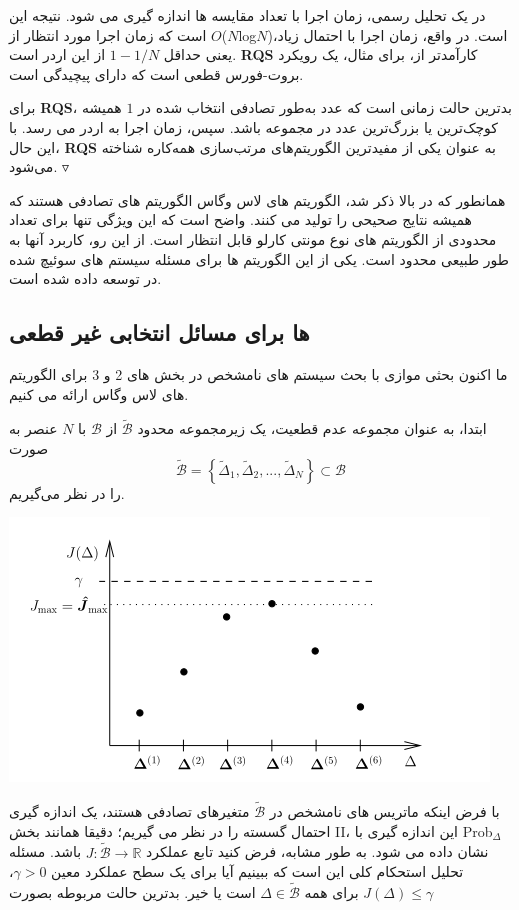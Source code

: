 \documentclass[12pt]{article} %
\begin{document}
	\par
	در یک تحلیل رسمی، زمان اجرا با تعداد مقایسه ها اندازه گیری می شود. نتیجه این است که زمان اجرا مورد انتظار از {$O$($N$log$N$)}\lr است. در واقع، زمان اجرا با احتمال زیاد، یعنی حداقل $1 − 1/N$ از این اردر است.  
	\cite{bib15}
	\textbf{RQS}
	 کارآمدتر از، برای مثال، یک رویکرد بروت-فورس قطعی است که دارای پیچیدگی
	 	است.
	\par
	برای \textbf{RQS}، بدترین حالت زمانی است که عدد به‌طور تصادفی انتخاب شده در $1$ همیشه کوچک‌ترین یا بزرگ‌ترین عدد در مجموعه باشد. سپس، زمان اجرا به اردر   می رسد. با این حال، \textbf{RQS} به عنوان یکی از مفیدترین الگوریتم‌های مرتب‌سازی همه‌کاره شناخته می‌شود.
	\cite{bib14}
	$\triangledown$
	\par
	همانطور که در بالا ذکر شد، الگوریتم های لاس وگاس الگوریتم های تصادفی هستند که همیشه نتایج صحیحی را تولید می کنند. واضح است که این ویژگی تنها برای تعداد محدودی از الگوریتم های نوع مونتی کارلو قابل انتظار است. از این رو، کاربرد آنها به طور طبیعی محدود است. یکی از این الگوریتم ها برای مسئله سیستم های سوئیچ شده در \cite{bib11} توسعه داده شده است.
	\par
	\subsection{ها برای مسائل انتخابی غیر قطعی}
	ما اکنون بحثی موازی با بحث سیستم های نامشخص در بخش های 2 و 3 برای الگوریتم های لاس وگاس ارائه می کنیم.
	\par
	ابتدا، به عنوان مجموعه عدم قطعیت، یک زیرمجموعه محدود $\tilde{\mathscr{B}}$ از $\mathscr{B}$ با $N$ عنصر به صورت
	\begin{equation*}
		\tilde{\mathscr{B}} = \left\{\tilde{\Delta}_1, \tilde{\Delta}_2, ..., \tilde{\Delta}_N\right\} \subset \mathscr{B}
	\end{equation*}
	را در نظر می‌گیریم.

	\begin{center}
		\includegraphics[width=0.35\linewidth]{2.png}
	\end{center}

	با فرض اینکه ماتریس های نامشخص در $\tilde{\mathscr{B}}$ متغیرهای تصادفی هستند، یک اندازه گیری احتمال گسسته را در نظر می گیریم؛ دقیقا همانند بخش II، این اندازه گیری با Prob$_\Delta$ نشان داده می شود. به طور مشابه، فرض کنید تابع عملکرد $J : \tilde{\mathscr{B}} → \mathbb{R}$ باشد. مسئله تحلیل استحکام کلی این است که ببینیم آیا برای یک سطح عملکرد معین $\gamma > 0$، $J(\Delta) \leq \gamma$ برای همه $\Delta \in \tilde{\mathscr{B}}$ است یا خیر. بدترین حالت مربوطه بصورت
	
\end{document}
